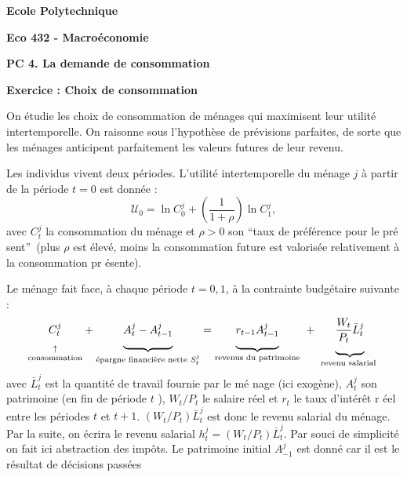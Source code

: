 \documentclass[a4paper,11pt]{article}
\begin{document}
\begin{center}
\textbf{Ecole Polytechnique}

\textbf{Eco 432 - Macro\'{e}conomie}

\bigskip

\textbf{PC 4. La demande de consommation}
\end{center}

\bigskip


\noindent \textbf{Exercice : Choix de consommation}

\smallskip

\noindent


On \'{e}tudie les choix de consommation de m\'{e}nages qui maximisent leur
utilit\'{e} intertemporelle. On raisonne sous l'hypoth\`{e}se de pr\'{e}visions parfaites,
de sorte que les m\'{e}nages anticipent parfaitement les valeurs futures de
leur revenu.

Les individus vivent deux périodes. L'utilit\'{e} intertemporelle du m\'{e}nage $j$ \`{a} partir de la p\'{e}riode $t=0$ est
donn\'{e}e :%
\begin{equation}
\mathcal{U}_{0}=\ln
C_{0}^{j} + \left( \frac{1}{1+\rho }\right) \ln
C_{1}^{j},  \label{2 - utilite intertemporelle}
\end{equation}%
avec $C_{t}^{j}$ la consommation du m\'{e}nage et $%
\rho >0$ son \textquotedblleft taux de pr\'{e}f\'{e}rence pour le pr\'{e}%
sent\textquotedblright\ (plus $\rho $ est \'{e}lev\'{e}, moins la
consommation future est valoris\'{e}e relativement \`{a} la consommation pr%
\'{e}sente).

Le m\'{e}nage fait face, \`{a} chaque p\'{e}riode $t=0,1$, \`{a} la contrainte
budg\'{e}taire suivante :%
\begin{equation}
\underset{\text{consommation}}{\underset{\uparrow }{\underset{}{C_{t}^{j}}}}+%
\underset{\text{\'{e}pargne financi\`{e}re nette }S_{t}^{j}}{\underbrace{%
\underset{}{A_{t}^{j}-A_{t-1}^{j}}}}=\underset{\text{revenus du patrimoine}}{%
\underbrace{\underset{}{r_{t-1}A_{t-1}^{j}}}}\ +\ \underset{\text{revenu
salarial }}{\underbrace{\underset{}{\frac{W_{t}}{P_{t}}\bar{L}_{t}^{j}}}}
\label{2 - CB}
\end{equation}%
avec $\bar{L}_{t}^{j}$ est la quantit\'{e} de travail fournie par le m\'{e}%
nage (ici exog\`{e}ne), $A_{t}^{j}$ son patrimoine (en fin de p\'{e}riode $t$%
), $W_{t}/P_{t}$ le salaire r\'{e}el et $r_{t}$ le taux d'int\'{e}r\^{e}t r%
\'{e}el entre les p\'{e}riodes $t$ et $t+1$. $(W_{t}/P_{t})\bar{L}_{t}^{j}$
est donc le revenu salarial du m\'{e}nage. Par la suite, on \'{e}crira le revenu salarial $h^j_t = (W_{t}/P_{t})\bar{L}_{t}^{j}$. Par souci de simplicit\'{e} on
fait ici abstraction des imp\^{o}ts. Le patrimoine initial $A^j_{-1}$  est donné car il est le résultat de décisions passées
\end{document}
